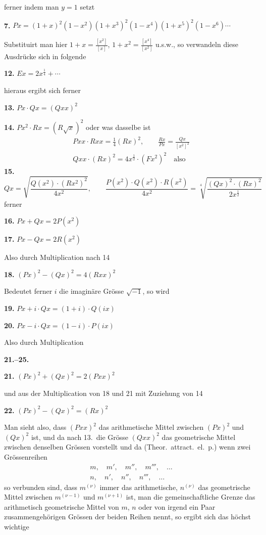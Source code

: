 \documentclass[10pt,a4paper]{article}
\begin{document}
ferner indem man $y = 1$ setzt

\textbf{7.} $Px = (1 + x)^2(1 - x^2)(1 + x^3)^2(1 - x^4)(1 + x^5)^2(1 - x^6) \cdots$

Substituirt man hier $1 + x = \frac{[x^2]}{[x]}$, $1 + x^2 = \frac{[x^4]}{[x^2]}$ u.s.w., so verwandeln diese Ausdr\"ucke sich in folgende

\textbf{12.} $Ex = 2x^{\frac{1}{4}} + \cdots$

hieraus ergibt sich ferner

\textbf{13.} $Px \cdot Qx = (Qxx)^2$

\textbf{14.} $Px^2 \cdot Rx = (R\sqrt{x})^2$ oder was dasselbe ist
%
\begin{gather*}
Pxx \cdot Rxx = \tfrac{1}{4}(Rx)^2, \qquad \frac{Rx}{Px} = \frac{Qx}{[x^2]^2} \\
Qxx \cdot (Rx)^2 = 4x^{\frac{1}{2}} \cdot (Fx^2)^2 \quad \text{also}
\end{gather*}
%
\textbf{15.}
\begin{equation*}
Qx = \sqrt{\frac{Q(x^2) \cdot (Rx^2)^2}{4x^2}}, \qquad
\frac{P(x^2) \cdot Q(x^2) \cdot R(x^2)}{4x^2} = \sqrt[4]{\frac{(Qx)^2 \cdot (Rx)^2}{2x^{\frac{1}{2}}}}
\end{equation*}
%
ferner

\textbf{16.} $Px + Qx = 2P(x^2)$

\textbf{17.} $Px - Qx = 2R(x^2)$

Also durch Multiplication nach 14

\textbf{18.} $(Px)^2 - (Qx)^2 = 4(Rxx)^2$

Bedeutet ferner $i$ die imagin\"are Gr\"osse $\sqrt{-1}$, so wird

\textbf{19.} $Px + i \cdot Qx = (1 + i) \cdot Q(ix)$

\textbf{20.} $Px - i \cdot Qx = (1 - i) \cdot P(ix)$

Also durch Multiplication

\newpage
\textbf{21.--25.}

\textbf{21.} $(Px)^2 + (Qx)^2 = 2(Pxx)^2$

und aus der Multiplication von 18 und 21 mit Zuziehung von 14

\textbf{22.} $(Px)^2 - (Qx)^2 = (Rx)^2$

Man sieht also, dass $(Pxx)^2$ das arithmetische Mittel zwischen $(Px)^2$ und $(Qx)^2$ ist, und da nach 13.\ die Gr\"osse $(Qxx)^2$ das geometrische Mittel zwischen denselben Gr\"ossen vorstellt und da (Theor.\ attract.\ el.\ p.) wenn zwei Gr\"ossenreihen
%
\begin{align*}
m, \quad m', \quad m'', \quad m''', \quad \ldots \\
n, \quad n', \quad n'', \quad n''', \quad \ldots
\end{align*}
%
so verbunden sind, dass $m^{(\nu)}$ immer das arithmetische, $n^{(\nu)}$ das geometrische Mittel zwischen $m^{(\nu-1)}$ und $m^{(\nu+1)}$ ist, man die gemeinschaftliche Grenze das arithmetisch geometrische Mittel von $m$, $n$ oder von irgend ein Paar zusammengeh\"origen Gr\"ossen der beiden Reihen nennt, so ergibt sich das h\"ochst wichtige
\end{document}
